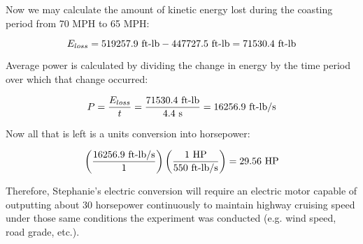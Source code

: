 \vskip 10pt

Now we may calculate the amount of kinetic energy lost during the coasting period from 70 MPH to 65 MPH:

$$E_{loss} = 519257.9 \hbox{ ft-lb} - 447727.5 \hbox{ ft-lb} = 71530.4 \hbox{ ft-lb}$$

\vskip 10pt

Average power is calculated by dividing the change in energy by the time period over which that change occurred:

$$P = {E_{loss} \over t} = {71530.4 \hbox{ ft-lb} \over 4.4 \hbox{ s}} = 16256.9 \hbox{ ft-lb/s}$$

\vskip 10pt

Now all that is left is a units conversion into horsepower:

$$\left(16256.9 \hbox{ ft-lb/s} \over 1 \right) \left(1 \hbox{ HP} \over 550 \hbox{ ft-lb/s}\right) = 29.56 \hbox{ HP}$$

\vskip 10pt

Therefore, Stephanie's electric conversion will require an electric motor capable of outputting about 30 horsepower continuously to maintain highway cruising speed under those same conditions the experiment was conducted (e.g. wind speed, road grade, etc.).







